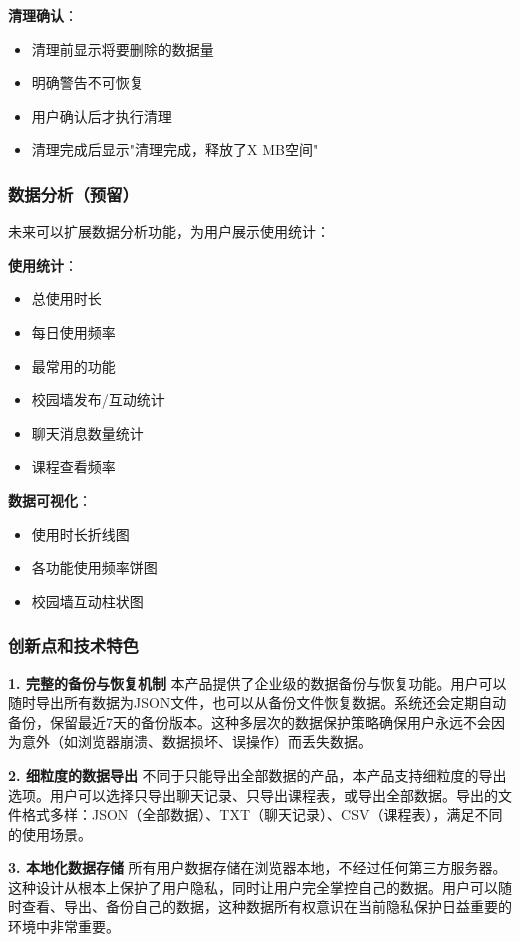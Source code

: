 \documentclass[12pt,a4paper]{article}
\begin{document}
\textbf{清理确认}：
\begin{itemize}
    \item 清理前显示将要删除的数据量
    \item 明确警告不可恢复
    \item 用户确认后才执行清理
    \item 清理完成后显示"清理完成，释放了X MB空间"
\end{itemize}

\subsubsection{数据分析（预留）}

未来可以扩展数据分析功能，为用户展示使用统计：

\textbf{使用统计}：
\begin{itemize}
    \item 总使用时长
    \item 每日使用频率
    \item 最常用的功能
    \item 校园墙发布/互动统计
    \item 聊天消息数量统计
    \item 课程查看频率
\end{itemize}

\textbf{数据可视化}：
\begin{itemize}
    \item 使用时长折线图
    \item 各功能使用频率饼图
    \item 校园墙互动柱状图
\end{itemize}

\subsubsection{创新点和技术特色}

\textbf{1. 完整的备份与恢复机制}
本产品提供了企业级的数据备份与恢复功能。用户可以随时导出所有数据为JSON文件，也可以从备份文件恢复数据。系统还会定期自动备份，保留最近7天的备份版本。这种多层次的数据保护策略确保用户永远不会因为意外（如浏览器崩溃、数据损坏、误操作）而丢失数据。

\textbf{2. 细粒度的数据导出}
不同于只能导出全部数据的产品，本产品支持细粒度的导出选项。用户可以选择只导出聊天记录、只导出课程表，或导出全部数据。导出的文件格式多样：JSON（全部数据）、TXT（聊天记录）、CSV（课程表），满足不同的使用场景。

\textbf{3. 本地化数据存储}
所有用户数据存储在浏览器本地，不经过任何第三方服务器。这种设计从根本上保护了用户隐私，同时让用户完全掌控自己的数据。用户可以随时查看、导出、备份自己的数据，这种数据所有权意识在当前隐私保护日益重要的环境中非常重要。
\end{document}
